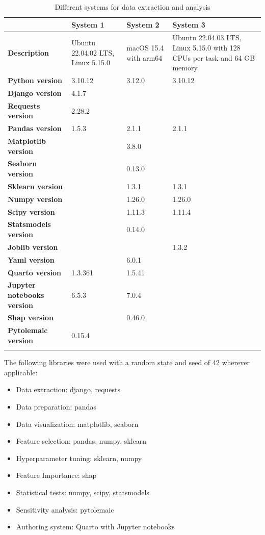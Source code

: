 \documentclass[referee,lineno,pdflatex,sn-nature]{sn-jnl}%
\theoremstyle{thmstyleone}%
\theoremstyle{thmstyletwo}%
\theoremstyle{thmstylethree}%
\begin{document}
\begin{appendices}
\begin{table}[h]
    \caption{Different systems for data extraction and analysis}%
    \begin{tabularx}{\textwidth}{@{}l LLL@{}}
        \toprule
        & System 1 & System 2 & System 3 \\
        \midrule
        \textbf{Description}    & Ubuntu 22.04.02 LTS, Linux 5.15.0 & macOS 15.4 with arm64 & Ubuntu 22.04.03 LTS, Linux 5.15.0 with 128 CPUs per task and 64 GB memory \\
        \textbf{Python version} & 3.10.12 & 3.12.0 & 3.10.12 \\
        \textbf{Django version} & 4.1.7 &  &  \\
        \textbf{Requests version} & 2.28.2 &  &  \\
        \textbf{Pandas version} & 1.5.3 & 2.1.1 & 2.1.1 \\
        \textbf{Matplotlib version} &  & 3.8.0 &  \\
        \textbf{Seaborn version} &  & 0.13.0 &  \\
        \textbf{Sklearn version} &  & 1.3.1 & 1.3.1 \\
        \textbf{Numpy version} &  & 1.26.0 & 1.26.0 \\
        \textbf{Scipy version} &  & 1.11.3 & 1.11.4 \\
        \textbf{Statsmodels version} &  & 0.14.0 &  \\
        \textbf{Joblib version} &  &  & 1.3.2 \\
        \textbf{Yaml version} &  & 6.0.1 &  \\
        \textbf{Quarto version} & 1.3.361 & 1.5.41 &  \\
        \textbf{Jupyter notebooks version} & 6.5.3 & 7.0.4 &  \\
        \textbf{Shap version} &  & 0.46.0 &  \\
        \textbf{Pytolemaic version} & 0.15.4 & \\
        \botrule
    \end{tabularx}
\end{table}

The following libraries were used with a random state and seed of 42 wherever applicable:
\begin{itemize}
    \item Data extraction: django, requests
    \item Data preparation: pandas 
    \item Data visualization: matplotlib, seaborn 
    \item Feature selection: pandas, numpy, sklearn 
    \item Hyperparameter tuning: sklearn, numpy
    \item Feature Importance: shap
    \item Statistical tests: numpy, scipy, statsmodels
    \item Sensitivity analysis: pytolemaic
    \item Authoring system: Quarto with Jupyter notebooks
\end{itemize}


\end{appendices}
\end{document}
